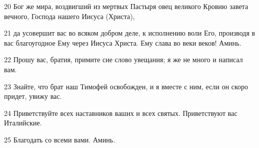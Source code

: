 \par 20 Бог же мира, воздвигший из мертвых Пастыря овец великого Кровию завета вечного, Господа нашего Иисуса (Христа),
\par 21 да усовершит вас во всяком добром деле, к исполнению воли Его, производя в вас благоугодное Ему через Иисуса Христа. Ему слава во веки веков! Аминь.
\par 22 Прошу вас, братия, примите сие слово увещания; я же не много и написал вам.
\par 23 Знайте, что брат наш Тимофей освобожден, и я вместе с ним, если он скоро придет, увижу вас.
\par 24 Приветствуйте всех наставников ваших и всех святых. Приветствуют вас Италийские.
\par 25 Благодать со всеми вами. Аминь.


